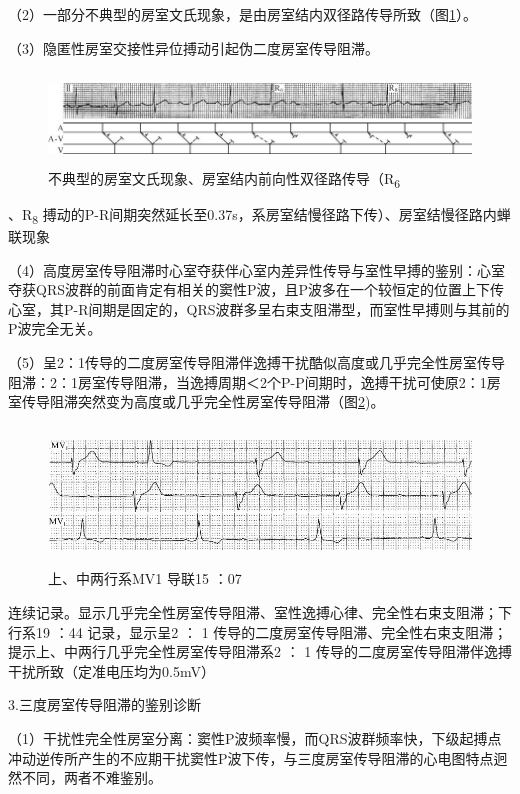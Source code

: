 （2）一部分不典型的房室文氏现象，是由房室结内双径路传导所致（图\ref{fig20-16}）。

（3）隐匿性房室交接性异位搏动引起伪二度房室传导阻滞。

\begin{figure}[!htbp]
 \centering
 \includegraphics[width=5.80208in,height=0.95833in]{./images/Image00345.jpg}
 \captionsetup{justification=centering}
 \caption{不典型的房室文氏现象、房室结内前向性双径路传导（R\textsubscript{6}}
 \label{fig20-16}
  \end{figure} 
、R\textsubscript{8}
搏动的P-R间期突然延长至0.37s，系房室结慢径路下传）、房室结慢径路内蝉联现象

（4）高度房室传导阻滞时心室夺获伴心室内差异性传导与室性早搏的鉴别：心室夺获QRS波群的前面肯定有相关的窦性P波，且P波多在一个较恒定的位置上下传心室，其P-R间期是固定的，QRS波群多呈右束支阻滞型，而室性早搏则与其前的P波完全无关。

（5）呈2：1传导的二度房室传导阻滞伴逸搏干扰酷似高度或几乎完全性房室传导阻滞：2：1房室传导阻滞，当逸搏周期＜2个P-P间期时，逸搏干扰可使原2：1房室传导阻滞突然变为高度或几乎完全性房室传导阻滞（图\ref{fig20-17})。

\begin{figure}[!htbp]
 \centering
 \includegraphics[width=5.58333in,height=1.44792in]{./images/Image00346.jpg}
 \captionsetup{justification=centering}
 \caption{上、中两行系MV1 导联15 ：07}
 \label{fig20-17}
  \end{figure} 
连续记录。显示几乎完全性房室传导阻滞、室性逸搏心律、完全性右束支阻滞；下行系19
：44 记录，显示呈2 ： 1
传导的二度房室传导阻滞、完全性右束支阻滞；提示上、中两行几乎完全性房室传导阻滞系2
： 1 传导的二度房室传导阻滞伴逸搏干扰所致（定准电压均为0.5mV）

3.三度房室传导阻滞的鉴别诊断

（1）干扰性完全性房室分离：窦性P波频率慢，而QRS波群频率快，下级起搏点冲动逆传所产生的不应期干扰窦性P波下传，与三度房室传导阻滞的心电图特点迥然不同，两者不难鉴别。

